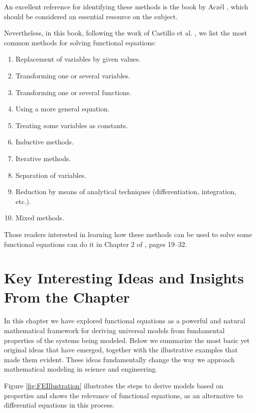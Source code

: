 An excellent reference for identifying these methods is the book by
Aczél \cite{aczel2006lectures}, which should be considered an essential
resource on the subject.

Nevertheless, in this book, following the work of Castillo et al.
\cite{castillo2004functional}, we list the most common methods for
solving functional equations:
\begin{enumerate}
\item Replacement of variables by given values.
\item Transforming one or several variables.
\item Transforming one or several functions.
\item Using a more general equation.
\item Treating some variables as constants.
\item Inductive methods.
\item Iterative methods.
\item Separation of variables.
\item Reduction by means of analytical techniques (differentiation, integration, etc.).
\item Mixed methods.
\end{enumerate}

Those readers interested in learning how these methods can be used to solve some functional equations can do it in Chapter 2 of \cite{castillo2004functional}, pages 19--32.

\section{Key Interesting Ideas and Insights From the Chapter}

In this chapter we have explored functional equations as a powerful and natural mathematical framework for deriving universal models from fundamental properties of the systems being modeled. Below we summarize the most basic yet original ideas that have emerged, together with the illustrative examples that made them evident. These ideas fundamentally change the way we approach mathematical modeling in science and engineering.

Figure \ref{fig:FEIllustration} illustrates the steps to derive models based on properties and shows the relevance of functional equations, as an alternative to differential equations in this process.


